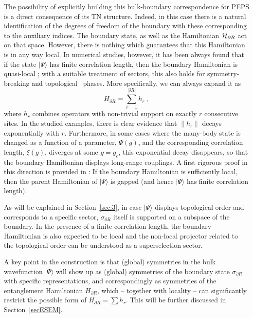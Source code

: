 \documentclass[rmp,aps,reprint,superscriptaddress,nobalancelastpage]{revtex4-1}
\newcommand{\be}{\begin{equation}}
\newcommand{\ee}{\end{equation}}
\newcommand{\ket}[1]{\vert#1\rangle}
\begin{document}
The possibility of explicitly building this bulk-boundary correspondence for PEPS is a direct consequence of its TN structure. Indeed, in this case there is a natural identification of the degrees of freedom of the boundary with these corresponding to the auxiliary indices. The boundary state, as well as the Hamiltonian ${\cal H}_{\partial R}$ act on that space. However, there is nothing which guarantees that this Hamiltonian is in any way local. In numerical studies, however, it has been always found that if the state $\ket\Psi$ has finite correlation length, then the boundary Hamiltonian is quasi-local \cite{cirac:peps-boundaries}; with a suitable treatment of sectors, this also holds for symmetry-breaking \cite{rispler:peps-symmetrybreaking,rispler:ZN-sym-breaking} and topological~\cite{schuch:topo-top} phases. More specifically, we can always expand it as
\be
    H_{\partial R} = \sum_{r=1}^{|\delta R|} h_r\ ,
\ee
where $h_r$ combines operators with non-trivial support on exactly $r$ consecutive sites. In the studied examples, there is clear evidence that $\|h_r\|$ decays exponentially with $r$. Furthermore, in some cases where the many-body state is changed as a function of a parameter, $\Psi(g)$, and the corresponding correlation length, $\xi(g)$, diverges at some $g=g_c$, this exponential decay disappears, so that the boundary Hamiltonian displays long-range couplings. A first rigorous proof in this direction is provided in \cite{kastoryano2019locality,perez-hernandez:thermal-1D}: If the boundary Hamiltonian is sufficiently local, then the parent Hamiltonian of $\ket\Psi$ is gapped (and hence $\ket\Psi$ has finite correlation length).

As will be explained in Section~\ref{sec:3}, in case $|\Psi\rangle$ displays topological order and corresponds to a specific sector, $\sigma_{\partial R}$ itself is supported on a subspace of the boundary. In the presence of a finite correlation length, the boundary Hamiltonian is also expected to be local \cite{schuch:topo-top,haegeman:shadows} and the non-local projector related to the topological order can be understood as a superselection sector.

A key point in the construction is that (global) symmetries in the bulk wavefunction $\ket\Psi$ will show up as (global) symmetries of the boundary state $\sigma_{\partial R}$ with specific representations, and correspondingly as symmetries of the entanglement Hamiltonian $H_{\partial R}$, which -- together with locality -- can significantly restrict the possible form of $H_{\partial R}=\sum h_r$.  This will be further discussed in  Section~\ref{secESEM}.
\end{document}
